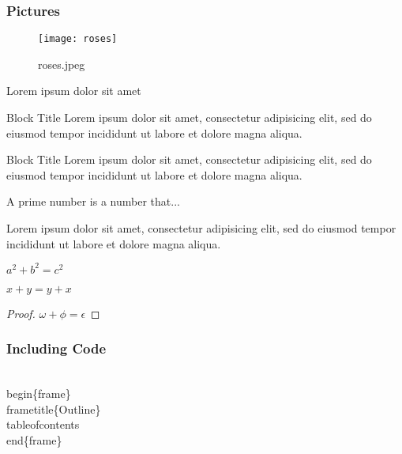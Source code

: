 \documentclass{beamer}
\begin{document}
\begin{frame}
\frametitle{Pictures}
\begin{figure}
\texttt{[image: roses]}
\caption{roses.jpeg}
\end{figure}
Lorem ipsum dolor sit amet
\end{frame}

\begin{frame}
\begin{block}{Block Title}
Lorem ipsum dolor sit amet, consectetur adipisicing elit, 
sed do eiusmod tempor incididunt ut labore et 
dolore magna aliqua.
\end{block}

\begin{alertblock}{Block Title}
Lorem ipsum dolor sit amet, consectetur adipisicing elit, 
sed do eiusmod tempor incididunt ut labore et 
dolore magna aliqua.
\end{alertblock}

\begin{definition}
A prime number is a number that...
\end{definition}

\begin{example}
Lorem ipsum dolor sit amet, consectetur adipisicing elit, 
sed do eiusmod tempor incididunt ut labore et
dolore magna aliqua.
\end{example}
\end{frame}

\begin{frame}
\begin{theorem}[Pythagoras] 
$ a^2 + b^2 = c^2$
\end{theorem}
\begin{corollary}
$ x + y = y + x  $
\end{corollary}
\begin{proof}
$\omega +\phi = \epsilon $
\end{proof}
\end{frame}

\begin{frame}[fragile]
\frametitle{Including Code}
\begin{semiverbatim}
\\begin\{frame\}
\\frametitle\{Outline\}
\\tableofcontents
\\end\{frame\}
\end{semiverbatim}
\end{frame}
\end{document}
